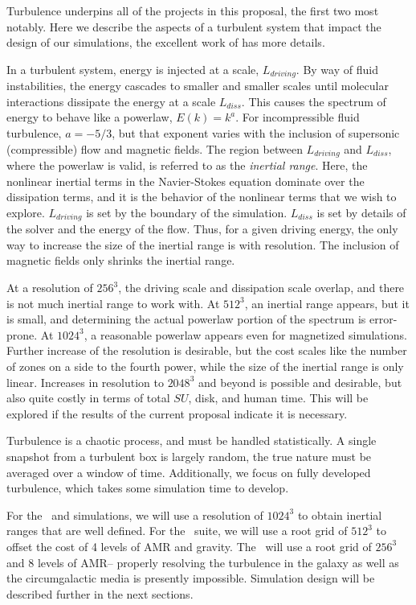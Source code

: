 Turbulence underpins all of the projects in this proposal, the first two most
notably.  Here we describe the aspects of a turbulent system that impact the
design of our simulations, the excellent work of \citet{Frisch95} has more
details.

In a turbulent system, energy is injected at a scale, $L_{driving}$.  By way of
fluid instabilities, the energy cascades to smaller and smaller scales until
molecular interactions dissipate the energy at a scale $L_{diss}$.  This causes the spectrum of energy
to behave like a powerlaw, $E(k)=k^{a}$.  For incompressible fluid turbulence,
$a=-5/3$, but that exponent varies with the inclusion of supersonic
(compressible) flow and magnetic fields.  The region between
$L_{driving}$ and $L_{diss}$, where the powerlaw is valid, is referred to as
the \emph{inertial range}.  Here, the nonlinear inertial terms in the
Navier-Stokes equation dominate over the dissipation terms, and it is the
behavior of the nonlinear terms that we wish to explore.  $L_{driving}$ is set
by the boundary of the simulation. $L_{diss}$ is set by details of the
solver and the energy of the flow.  Thus, for a given driving energy, the only
way to increase the size of the inertial range is with resolution.  The
inclusion of magnetic fields only shrinks the inertial range.

At a resolution of $256^3$, the driving scale and dissipation scale overlap, and
there is not much inertial range to work with.  At $512^3$, an inertial range
appears, but it is small, and determining the actual powerlaw portion of the
spectrum is error-prone.  At $1024^3$, a reasonable powerlaw appears even for
magnetized simulations.  Further increase of the resolution is desirable, but
the cost scales like the number of zones on a side to the fourth power, while
the size of the inertial range is only linear.  Increases in resolution to
$2048^3$ and beyond is possible and desirable, but also quite costly in terms of
total $SU$, disk, and human time.  This will be explored if the results of the
current proposal indicate it is necessary.  

Turbulence is a chaotic process, and must be handled statistically.  A single
snapshot from a turbulent box is largely random, the true nature must be
averaged over a window of time.  Additionally, we focus on fully developed
turbulence, which takes some simulation time to develop.  

For the \nameCMB\ and \nameTurbulence simulations, we will use a resolution of $1024^3$ to
obtain inertial ranges that are well defined.  For the \nameCores\ suite, we
will use a root grid of $512^3$ to offset the cost of 4 levels of AMR and
gravity.  The
\nameGalaxies\ will use a root grid of $256^3$ and 8 levels of AMR-- properly
resolving the turbulence in the galaxy as well as the circumgalactic media is
presently impossible.  Simulation design will be described further in the next
sections.
